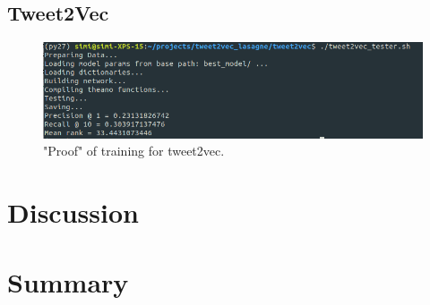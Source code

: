\documentclass[10pt,conference,compsocconf]{IEEEtran}
\begin{document}
\subsection{Tweet2Vec}
\begin{figure}
	\centering
	\includegraphics[width=0.7\linewidth]{images/tweet2vec_training}
	\caption{"Proof" of training for tweet2vec.}
	\label{fig:tweet2vectraining}
\end{figure}


\section{Discussion}
\label{sec:Discussion}

\section{Summary}
\label{sec:Summary}





\end{document}
